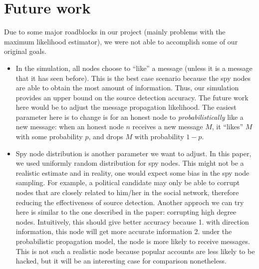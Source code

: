 \section{Future work}

Due to some major roadblocks in our project (mainly problems with the maximum likelihood estimator), we were not able to accomplish some of our original goals. 

\begin{itemize}

\item In the simulation, all nodes choose to ``like'' a message (unless it is a message that it has seen before). This is the best case scenario because the spy nodes are able to obtain the most amount of information. Thus, our simulation provides an upper bound on the source detection accuracy. The future work here would be to adjust the message propagation likelihood. The easiest parameter here is to change is for an honest node to \emph{probabilistically} like a new message: when an honest node $n$ receives a new message $M$, it ``likes'' $M$ with some probability $p$, and drops $M$ with probability $1-p$.

\item Spy node distribution is another parameter we want to adjust. In this paper, we used uniformly random distribution for spy nodes. This might not be a realistic estimate and in reality, one would expect some bias in the spy node sampling. For example, a political candidate may only be able to corrupt nodes that are closely related to him/her in the social network, therefore reducing the effectiveness of source detection. Another approch we can try here is similar to the one described in the paper: corrupting high degree nodes. Intuitively, this should give better accuracy because 1. with direction information, this node will get more accurate information 2. under the probabilistic propagation model, the node is more likely to receive messages. This is not such a realistic node because popular accounts are less likely to be hacked, but it will be an interesting case for comparison nonetheless.

\end{itemize}
